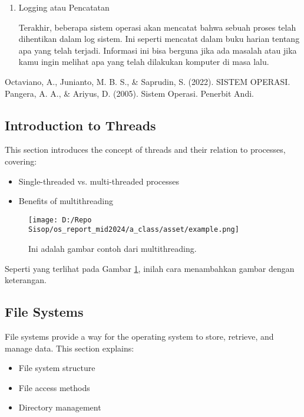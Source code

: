 \documentclass[12pt]{article}
\begin{document}
\begin{itemize}
\begin{enumerate}
        \item  Logging atau Pencatatan
        

        Terakhir, beberapa sistem operasi akan mencatat bahwa 
        sebuah proses telah dihentikan dalam log sistem. Ini 
        seperti mencatat dalam buku harian tentang apa yang telah 
        terjadi. Informasi ini bisa berguna jika ada masalah atau
        jika kamu ingin melihat apa yang telah dilakukan komputer 
        di masa lalu. 
    \end{enumerate}
\end{itemize}
\begin{thebibliography}{99}
    \bibitem{}
    Octaviano, A., Junianto, M. B. S., \& Saprudin, S. (2022). SISTEM OPERASI.
    \bibitem{}
    Pangera, A. A., \& Ariyus, D. (2005). Sistem Operasi. Penerbit Andi.
\end{thebibliography}

\subsection{Introduction to Threads}
This section introduces the concept of threads and their relation to processes, covering:
\begin{itemize}
    \item Single-threaded vs. multi-threaded processes
    \item Benefits of multithreading
\end{itemize}

\begin{figure}[h]
    \centering
    \texttt{[image: D:/Repo Sisop/os\_report\_mid2024/a\_class/asset/example.png]}  %
    \caption{Ini adalah gambar contoh dari multithreading.}
    \label{fig:contoh_gambar}
\end{figure}

Seperti yang terlihat pada Gambar \ref{fig:contoh_gambar}, inilah cara menambahkan gambar dengan keterangan.

\subsection{File Systems}
File systems provide a way for the operating system to store, retrieve, and manage data. This section explains:
\begin{itemize}
    \item File system structure
    \item File access methods
    \item Directory management
\end{itemize}
\end{document}
